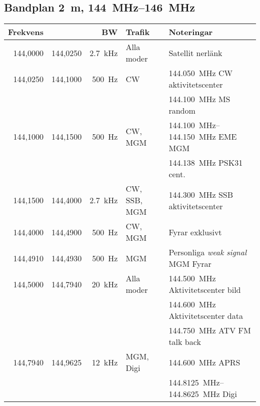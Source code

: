 \subsection{Bandplan \qty{2}{\metre}, \SIrange{144}{146}{\mega\hertz}}
\label{144MHZbandplan}

\begin{tabular}{rrrll}
\textbf{Frekvens} &           & \textbf{BW} & \textbf{Trafik}
& \textbf{Noteringar}                                             \\ \hline

144,0000 & 144,0250  & \qty{2,7}{\kilo\hertz}  & Alla moder  & Satellit nerlänk                                \\\hline
144,0250 & 144,1000  & \qty{500}{\hertz}  & CW     & \qty{144,050}{\mega\hertz} CW aktivitetscenter            \\
         &           &         &              & \qty{144,100}{\mega\hertz} MS random                            \\ \hline
144,1000 & 144,1500  & \qty{500}{\hertz}  & CW, MGM      & \SIrange{144,100}{144,150}{\mega\hertz} EME MGM      \\
         &           &         &              & \qty{144,138}{\mega\hertz} PSK31 cent.                          \\ \hline
144,1500 & 144,4000  & \qty{2,7}{\kilo\hertz} & CW, SSB, MGM & \qty{144,300}{\mega\hertz} SSB aktivitetscenter  \\ \hline
144,4000 & 144,4900  & \qty{500}{\hertz} & CW, MGM & Fyrar exklusivt                       \\ \hline
144,4910 & 144,4930  & \qty{500}{\hertz} & MGM & Personliga \emph{weak signal} MGM Fyrar                        \\ \hline
144,5000 & 144,7940  & \qty{20}{\kilo\hertz}  & Alla moder   & \qty{144,500}{\mega\hertz} Aktivitetscenter bild \\
         &           &         &              & \qty{144,600}{\mega\hertz} Aktivitetscenter data                \\
         &           &         &              & \qty{144,750}{\mega\hertz} ATV FM talk back                     \\ \hline
144,7940 & 144,9625  & \qty{12}{\kilo\hertz}  & MGM, Digi & \qty{144,600}{\mega\hertz} APRS                   \\
         &           &         &              &	\SIrange{144,8125}{144,8625}{\mega\hertz} Digi                \\

\end{tabular}
